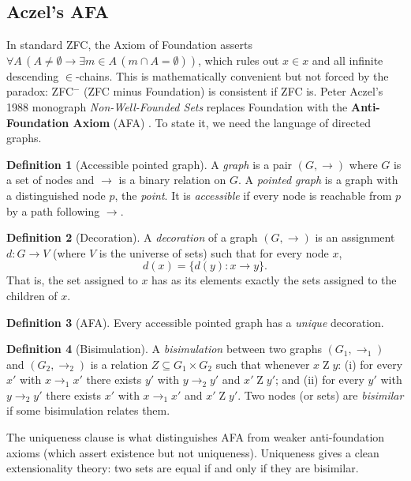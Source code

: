 \documentclass[12pt]{article}
\theoremstyle{definition}
\newtheorem{definition}{Definition}
\begin{document}
\subsection{Aczel's AFA}

In standard ZFC, the Axiom of Foundation asserts $\forall A\,(A \neq \emptyset \to \exists m \in A\,(m \cap A = \emptyset))$, which rules out $x \in x$ and all infinite descending $\in$-chains. This is mathematically convenient but not forced by the paradox: ZFC$^-$ (ZFC minus Foundation) is consistent if ZFC is. Peter Aczel's 1988 monograph \emph{Non-Well-Founded Sets} replaces Foundation with the \textbf{Anti-Foundation Axiom} (AFA) \cite{aczel}. To state it, we need the language of directed graphs.

\begin{definition}[Accessible pointed graph]
A \emph{graph} is a pair $(G, \to)$ where $G$ is a set of nodes and $\to$ is a binary relation on $G$. A \emph{pointed graph} is a graph with a distinguished node $p$, the \emph{point}. It is \emph{accessible} if every node is reachable from $p$ by a path following $\to$.
\end{definition}

\begin{definition}[Decoration]
A \emph{decoration} of a graph $(G, \to)$ is an assignment $d: G \to V$ (where $V$ is the universe of sets) such that for every node $x$,
\[
d(x) = \{d(y) : x \to y\}.
\]
That is, the set assigned to $x$ has as its elements exactly the sets assigned to the children of $x$.
\end{definition}

\begin{definition}[AFA]
Every accessible pointed graph has a \emph{unique} decoration.
\end{definition}

\begin{definition}[Bisimulation]
A \emph{bisimulation} between two graphs $(G_1, \to_1)$ and $(G_2, \to_2)$ is a relation $Z \subseteq G_1 \times G_2$ such that whenever $x \mathrel{Z} y$: (i) for every $x'$ with $x \to_1 x'$ there exists $y'$ with $y \to_2 y'$ and $x' \mathrel{Z} y'$; and (ii) for every $y'$ with $y \to_2 y'$ there exists $x'$ with $x \to_1 x'$ and $x' \mathrel{Z} y'$. Two nodes (or sets) are \emph{bisimilar} if some bisimulation relates them.
\end{definition}

The uniqueness clause is what distinguishes AFA from weaker anti-foundation axioms (which assert existence but not uniqueness). Uniqueness gives a clean extensionality theory: two sets are equal if and only if they are bisimilar.
\end{document}

